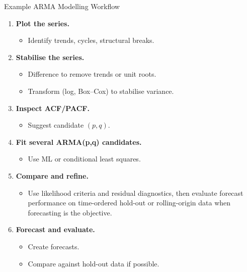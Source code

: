 \documentclass{beamer}
\begin{document}
\begin{frame}{Example ARMA Modelling Workflow}
  \begin{enumerate}
    \item \textbf{Plot the series.}
      \begin{itemize}
        \item Identify trends, cycles, structural breaks.
      \end{itemize}
    \item \textbf{Stabilise the series.}
      \begin{itemize}
        \item Difference to remove trends or unit roots.
        \item Transform (log, Box--Cox) to stabilise variance.
      \end{itemize}
    \item \textbf{Inspect ACF/PACF.}
      \begin{itemize}
        \item Suggest candidate $(p, q)$.
      \end{itemize}
    \item \textbf{Fit several ARMA(p,q) candidates.}
      \begin{itemize}
        \item Use ML or conditional least squares.
      \end{itemize}
    \item \textbf{Compare and refine.}
      \begin{itemize}
        \item Use likelihood criteria and residual diagnostics, then evaluate forecast performance on time-ordered hold-out or rolling-origin data when forecasting is the objective.
      \end{itemize}
    \item \textbf{Forecast and evaluate.}
      \begin{itemize}
        \item Create forecasts.
        \item Compare against hold-out data if possible.
      \end{itemize}
  \end{enumerate}
\end{frame}
\end{document}
